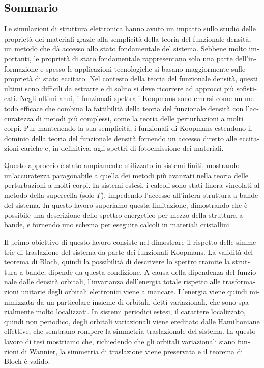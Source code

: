 \begin{otherlanguage}{italian}
\cleardoublepage
\chapter*{Sommario}
\vspace{1.7cm}
%

Le simulazioni di struttura elettronica hanno avuto un impatto sullo studio delle propriet\`{a} dei materiali grazie alla semplicit\`{a} della teoria del funzionale densit\`{a}, un metodo che d\`{a} accesso allo stato fondamentale del sistema. Sebbene molto importanti, le propriet\`{a} di stato fondamentale rappresentano solo una parte dell'informazione e spesso le applicazioni tecnologiche si basano maggiormente sulle propriet\`{a} di stato eccitato. Nel contesto della teoria del funzionale densit\`{a}, questi ultimi sono difficili da estrarre e di solito si deve ricorrere ad approcci più sofisticati. Negli ultimi anni, i funzionali spettrali Koopmans sono emersi come un metodo efficace che combina la fattibilit\`{a} della teoria del funzionale densit\`{a} con l'accuratezza di metodi più complessi, come la teoria delle perturbazioni a molti corpi. Pur mantenendo la sua semplicit\`{a}, i funzionali di Koopmans estendono il dominio della teoria del funzionale densit\`{a} fornendo un accesso diretto alle eccitazioni cariche e, in definitiva, agli spettri di fotoemissione dei materiali.

Questo approccio \`{e} stato ampiamente utilizzato in sistemi finiti, mostrando un'accuratezza paragonabile a quella dei metodi più avanzati nella teoria delle perturbazioni a molti corpi. In sistemi estesi, i calcoli sono stati finora vincolati al metodo della supercella (solo $\Gamma$), impedendo l'accesso all'intera struttura a bande del sistema. In questo lavoro superiamo questa limitazione, dimostrando che \`{e} possibile una descrizione dello spettro energetico  per mezzo della struttura a bande, e fornendo uno schema per eseguire calcoli in materiali cristallini.

Il primo obiettivo di questo lavoro consiste nel dimostrare il rispetto delle simmetrie di traslazione del sistema da parte dei funzionali Koopmans. La validit\`{a} del teorema di Bloch, quindi la possibilit\`{a} di descrivere lo spettro tramite la struttura a bande, dipende da questa condizione. A causa della dipendenza del funzionale dalle densit\`{a} orbitali, l'invarianza dell'energia totale rispetto alle trasformazioni unitarie degli orbitali elettronici viene a mancare. L'energia viene quindi minimizzata da un particolare insieme di orbitali, detti variazionali, che sono spazialmente molto localizzati. In sistemi periodici estesi, il carattere localizzato, quindi non periodico, degli orbitali variazionali viene ereditato dalle Hamiltoniane effettive, che sembrano rompere la simmetria traslazionale del sistema. In questo lavoro di tesi mostriamo che, richiedendo che gli orbitali variazionali siano funzioni di Wannier, la simmetria di traslazione viene preservata e il teorema di Bloch \`{e} valido.


\end{otherlanguage}
